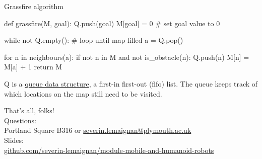 \documentclass[compress,xcolor=table]{beamer}
\begin{document}
\begin{frame}[fragile]{Grassfire algorithm}

\begin{pythoncode}

def grassfire(M, goal):
    Q.push(goal)
    M[goal] = 0 # set goal value to 0

    while not Q.empty(): # loop until map filled
        a = Q.pop()

        for n in neighbours(a):
            if not n in M and not is_obstacle(n):
                Q.push(n)
                M[n] = M[a] + 1
    return M
\end{pythoncode}

Q is a \href{http://en.wikipedia.org/wiki/Queue_(abstract_data_type)}{queue
data structure}, a first-in first-out (fifo) list. The queue keeps track of
which locations on the map still need to be visited.

\end{frame}


\begin{frame}{}
    \begin{center}
        \Large
        That's all, folks!\\[2em]
        \normalsize
        Questions:\\
        Portland Square B316 or \url{severin.lemaignan@plymouth.ac.uk} \\[1em]

        Slides:\\ \href{https://github.com/severin-lemaignan/module-mobile-and-humanoid-robots}{\small github.com/severin-lemaignan/module-mobile-and-humanoid-robots}

    \end{center}
\end{frame}
\end{document}
